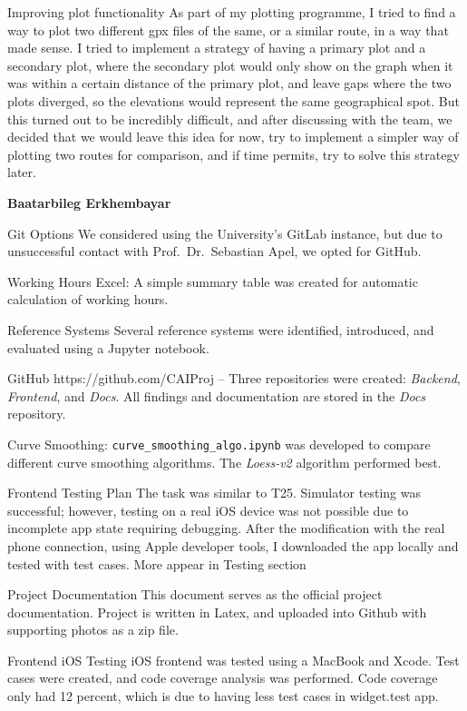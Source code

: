 \documentclass[12pt]{article}
\begin{document}
Improving plot functionality
As part of my plotting programme, I tried to find a way to plot two different gpx files of the same, or a similar route, in a way that made sense. I tried to implement a strategy of having a primary plot and a secondary plot, where the secondary plot would only show on the graph when it was within a certain distance of the primary plot, and leave gaps where the two plots diverged, so the elevations would represent the same geographical spot. But this turned out to be incredibly difficult, and after discussing with the team, we decided that we would leave this idea for now, try to implement a simpler way of plotting two routes for comparison, and if time permits, try to solve this strategy later.

{\large\textbf{Baatarbileg Erkhembayar}}

Git Options
We considered using the University's GitLab instance, but due to unsuccessful contact with Prof.\ Dr.\ Sebastian Apel, we opted for GitHub.

Working Hours Excel:
A simple summary table was created for automatic calculation of working hours.

Reference Systems
Several reference systems were identified, introduced, and evaluated using a Jupyter notebook.

GitHub
https://github.com/CAIProj – Three repositories were created: \textit{Backend}, \textit{Frontend}, and \textit{Docs}. All findings and documentation are stored in the \textit{Docs} repository.

Curve Smoothing: \texttt{curve\_smoothing\_algo.ipynb} was developed to compare different curve smoothing algorithms. The \textit{Loess-v2} algorithm performed best.

Frontend Testing Plan
The task was similar to T25. Simulator testing was successful; however, testing on a real iOS device was not possible due to incomplete app state requiring debugging.
After the modification with the real phone connection, using Apple developer tools, I downloaded the app locally and tested with test cases. More appear in Testing section

Project Documentation
This document serves as the official project documentation. Project is written in Latex, and uploaded into Github with supporting photos as a zip file.

Frontend iOS Testing
iOS frontend was tested using a MacBook and Xcode. Test cases were created, and code coverage analysis was performed. Code coverage only had 12 percent, which is due to having less test cases in widget.test app. 
\end{document}
